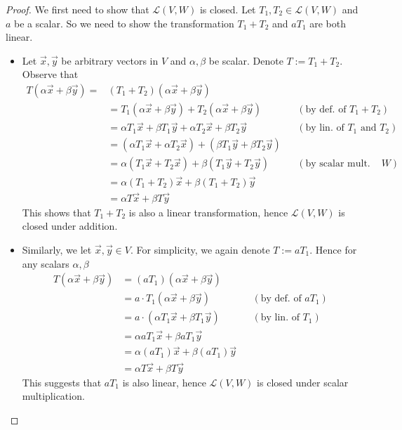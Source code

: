 \documentclass{article}
\begin{document}
\begin{proof}
  We first need to show that $\mathcal{L}(V,W)$ is closed.
  Let $T_1, T_2\in\mathcal{L}(V,W)$ and $a$ be a scalar.
  So we need to show the transformation $T_1+T_2$ and $a T_1$ 
  are both linear. 
  \begin{itemize}
    \item Let $\vec{x}, \vec{y}$ be arbitrary vectors in $V$ 
      and $\alpha,\beta$ be scalar. 
      Denote $T:=T_1+T_2$. Observe that 
      \begin{align*}
        T(\alpha\vec{x}+\beta\vec{y})
        =&(T_1+T_2)(\alpha\vec{x}+\beta\vec{y})\\
        &=T_1(\alpha\vec{x}+\beta\vec{y})+T_2(\alpha\vec{x}+\beta\vec{y}) && (\text{by def. of $T_1+T_2$})\\
        &=\alpha T_1\vec{x}+\beta T_1\vec{y}+\alpha T_2\vec{x}+\beta T_2\vec{y} && (\text{by lin. of $T_1$ and $T_2$})\\
        &=(\alpha T_1\vec{x}+\alpha T_2\vec{x}) + (\beta T_1\vec{y}+\beta T_2\vec{y})\\
        &=\alpha (T_1\vec{x}+T_2\vec{x}) + \beta (T_1\vec{y}+T_2\vec{y}) && (\text{by scalar mult. in $W$})\\
        &=\alpha (T_1+T_2)\vec{x}+\beta (T_1+T_2)\vec{y}\\
        &=\alpha T\vec{x}+\beta T\vec{y}
      \end{align*}
      This shows that $T_1+T_2$ is also a linear transformation, hence 
      $\mathcal{L}(V,W)$ is closed under addition.
    \item Similarly, we let $\vec{x},\vec{y}\in V$. For simplicity, we again 
      denote $T:=a T_1$. Hence for any scalars $\alpha, \beta$
      \begin{align*}
        T(\alpha\vec{x}+\beta\vec{y})
        &=(aT_1)(\alpha\vec{x}+\beta\vec{y})\\
        &=a\cdot T_1(\alpha\vec{x}+\beta\vec{y}) && (\text{by def. of $aT_1$})\\
        &=a\cdot (\alpha T_1\vec{x}+\beta T_1\vec{y}) && (\text{by lin. of $T_1$})\\
        &=\alpha aT_1\vec{x}+\beta aT_1\vec{y}\\
        &=\alpha (aT_1)\vec{x}+\beta (aT_1){\vec{y}}\\
        &=\alpha T\vec{x}+\beta T\vec{y}
      \end{align*}
      This suggests that $aT_1$ is also linear, hence $\mathcal{L}(V,W)$
      is closed under scalar multiplication.

\end{itemize}
\end{proof}
\end{document}
